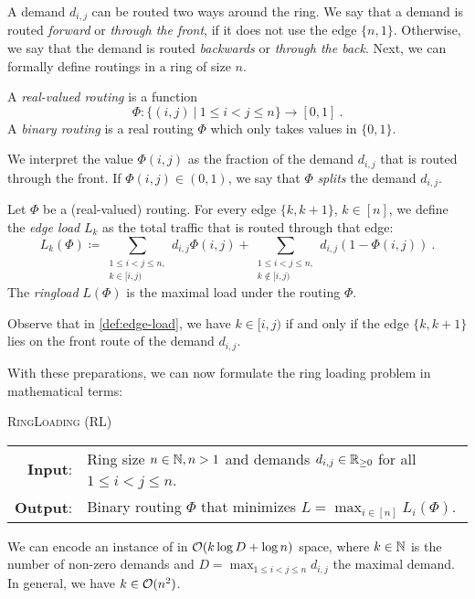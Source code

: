 A demand $d_{i, j}$ can be routed two ways around the ring.
We say that a demand is routed \emph{forward} or \emph{through the front}, if it does not use the edge $\{n, 1\}$.
Otherwise, we say that the demand is routed \emph{backwards} or \emph{through the back}.
Next, we can formally define routings in a ring of size $n$.
\begin{definition}[Routing]
	\label{def:routing}
	A \emph{real-valued routing} is a function 
	\begin{equation}
		\Phi: \{(i, j)\ | \ 1 \leq i < j \leq n\} \rightarrow [0, 1] \ .
	\end{equation}
	A \emph{binary routing} is a real routing $\Phi$ which only takes values in $\{0, 1\}$. 
\end{definition}
We interpret the value $\Phi(i, j)$ as the fraction of the demand $d_{i, j}$ that is routed through the front.
If $\Phi(i, j) \in (0, 1)$, we say that $\Phi$ \emph{splits} the demand $d_{i, j}$.

\begin{definition}
	\label{def:edge-load}
	Let $\Phi$ be a (real-valued) routing.
	For every edge $\{k, k+1\}$, $k \in [n]$, we define the \emph{edge load} $L_k$ as the total traffic that is routed through that edge:
	\begin{equation}
		\label{eq:edge-load}
		L_k(\Phi) \coloneqq \sum_{\substack{1 \leq i < j \leq n,\\ k \in [i, j)}} d_{i, j} \Phi(i, j) + \sum_{\substack{1 \leq i < j \leq n,\\ k \notin [i, j)}} d_{i, j} (1 - \Phi(i, j)) \ .
	\end{equation}
	The \emph{ringload} $L(\Phi)$ is the maximal load under the routing $\Phi$.
\end{definition}
Observe that in \cref{def:edge-load}, we have $k \in [i, j)$ if and only if the edge $\{k, k+1\}$ lies on the front route of the demand $d_{i, j}$.

With these preparations, we can now formulate the ring loading problem in mathematical terms:
\begin{center}
	\begin{mdframed}
		\centering
		\textsc{RingLoading} (\textsc{RL})\\[0.7em]
		\begin{tabular}{rl}
			{\bfseries Input}: & Ring size $n \in \mathbb{N}, n > 1$ and demands $d_{i, j} \in \mathbb{R}_{\geq 0}$ for all $1 \leq i<j\leq n$.\\
			{\bfseries Output}: & Binary routing $\Phi$ that minimizes $L = \max_{i \in [n]} L_i(\Phi)$.
		\end{tabular}
	\end{mdframed}
\end{center}
We can encode an instance of \RL in $\mathcal{O}(k \log D + \log n)$ space, where $k \in \mathbb{N}$ is the number of non-zero demands and $D = \max_{1 \leq i < j \leq n}d_{i, j}$ the maximal demand.
In general, we have $k \in \mathcal{O}(n^2)$.


